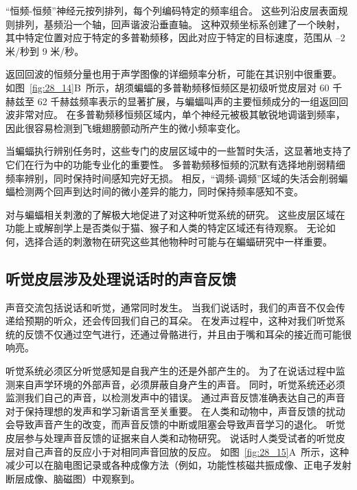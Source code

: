 “恒频-恒频”神经元按列排列，每个列编码特定的频率组合。
这些列沿皮层表面规则排列，基频沿一个轴，回声谐波沿垂直轴。
这种双频坐标系创建了一个映射，其中特定位置对应于特定的多普勒频移，因此对应于特定的目标速度，范围从 –2 米/秒到 9 米/秒。


返回回波的恒频分量也用于声学图像的详细频率分析，可能在其识别中很重要。
如图~\ref{fig:28_14}B~所示，胡须蝙蝠的多普勒频移恒频区是初级听觉皮层对 60 千赫兹至 62 千赫兹频率表示的显著扩展，与蝙蝠叫声的主要恒频成分的一组返回回波非常对应。
在多普勒频移恒频区域内，单个神经元被极其敏锐地调谐到频率，因此很容易检测到飞蛾翅膀颤动所产生的微小频率变化。


当蝙蝠执行辨别任务时，这些专门的皮层区域中的一些暂时失活，这显著地支持了它们在行为中的功能专业化的重要性。
多普勒频移恒频的沉默有选择地削弱精细频率辨别，同时保持时间感知完好无损。
相反，“调频-调频”区域的失活会削弱蝙蝠检测两个回声到达时间的微小差异的能力，同时保持频率感知不变。


对与蝙蝠相关刺激的了解极大地促进了对这种听觉系统的研究。
这些皮层区域在功能上或解剖学上是否类似于猫、猴子和人类的特定区域还有待观察。
无论如何，选择合适的刺激物在研究这些其他物种时可能与在蝙蝠研究中一样重要。



\subsection{听觉皮层涉及处理说话时的声音反馈}

声音交流包括说话和听觉，通常同时发生。
当我们说话时，我们的声音不仅会传递给预期的听众，还会传回我们自己的耳朵。
在发声过程中，这种对我们听觉系统的反馈不仅通过空气进行，还通过骨骼进行，并且由于嘴和耳朵的接近而可能很响亮。


听觉系统必须区分听觉感知是自我产生的还是外部产生的。
为了在说话过程中监测来自声学环境的外部声音，必须屏蔽自身产生的声音。
同时，听觉系统还必须监测我们自己的声音，以检测发声中的错误。
通过声音反馈准确表达自己的声音对于保持理想的发声和学习新语言至关重要。
在人类和动物中，声音反馈的扰动会导致声音产生的改变，而声音反馈的中断或阻塞会导致声音学习的退化。
听觉皮层参与处理声音反馈的证据来自人类和动物研究。
说话时人类受试者的听觉皮层对自己声音的反应小于对相同声音回放的反应。
如图~\ref{fig:28_15}A~所示，这种减少可以在脑电图记录或各种成像方法（例如，功能性核磁共振成像、正电子发射断层成像、脑磁图）中观察到。


